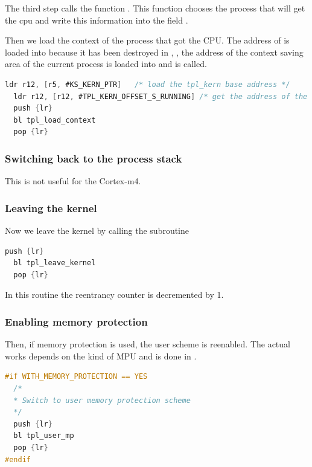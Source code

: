 The third step calls the function . This function chooses the process that will get the cpu and write this information into the field .

Then we load the context of the process that got the CPU. The address of  is loaded into  because it has been destroyed in , , the address of the context saving area of the current process is loaded into  and  is called.

\begin{lstlisting}[language=C]
  ldr r12, [r5, #KS_KERN_PTR]	/* load the tpl_kern base address */
  ldr r12, [r12, #TPL_KERN_OFFSET_S_RUNNING] /* get the address of the context bloc */
  push {lr}
  bl tpl_load_context
  pop {lr}
\end{lstlisting}

\subsubsection{Switching back to the process stack}

This is not useful for the Cortex-m4.

\subsubsection{Leaving the kernel}

Now we leave the kernel by calling the subroutine 
\begin{lstlisting}[language=C]
  push {lr}
  bl tpl_leave_kernel
  pop {lr}
\end{lstlisting}

In this routine the reentrancy counter is decremented by 1.

\subsubsection{Enabling memory protection}

Then, if memory protection is used, the user scheme is reenabled. The actual works depends on the kind of MPU and is done in .

\begin{lstlisting}[language=C]
#if WITH_MEMORY_PROTECTION == YES
  /*
  * Switch to user memory protection scheme
  */
  push {lr}
  bl tpl_user_mp
  pop {lr}
#endif
\end{lstlisting}


